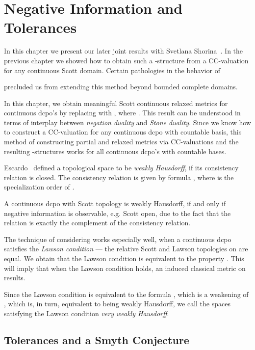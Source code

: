 \chapter{Negative Information and Tolerances} \label{chap:Neginfo}

In this chapter we present our later joint results with
Svetlana Shorina~\cite{BukatinShorina3,BukatinShorina4}.
In the previous chapter 
we showed how to obtain such a -structure
from a CC-valuation for any continuous Scott domain.
Certain pathologies in the behavior of

precluded us from extending this
method beyond bounded complete domains.

In this chapter, we obtain meaningful Scott continuous relaxed metrics
for continuous dcpo's by replacing  with
,
where .
This result can be understood
in terms of interplay between {\em negation duality} and
{\em Stone duality}.
Since we know how to construct a CC-valuation for any
continuous dcpo with countable basis, this method of
constructing partial and relaxed metrics via
CC-valuations and the resulting -structures
works for all continuous dcpo's with countable bases.

Escardo~\cite{Escardo, Smyth2} defined a topological space  to be
{\em weakly Hausdorff}, if its consistency relation is closed.
The consistency relation is given by formula
, where  is the
specialization order of .

A continuous dcpo with Scott topology is
weakly Hausdorff, if and only if
negative information  is observable, e.g. Scott open,
due to the fact that the relation
 is exactly the complement of
the consistency relation.

The technique of considering  works especially well,
when a continuous dcpo  satisfies the {\em Lawson condition} ---
the relative Scott and Lawson topologies on  are equal.
We obtain that the Lawson condition is equivalent to the
property . This will imply
that when the Lawson condition holds,
an induced classical metric on 
results.

Since the Lawson condition is
equivalent to the formula ,
which is a weakening of , which is, in turn, equivalent to
 being weakly Hausdorff, we call the spaces satisfying the Lawson
condition {\em very weakly Hausdorff}.

\section{Tolerances and a Smyth Conjecture}


